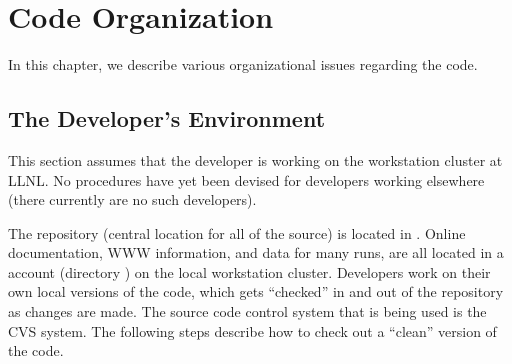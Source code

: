 
\chapter{Code Organization}
\label{Code Organization}

In this chapter, we describe various organizational issues
regarding the \parflow{} code.


\section{The Developer's Environment}
\label{The Developer's Environment}

This section assumes that the developer is working on the workstation
cluster at LLNL.  No procedures have yet been devised for developers
working elsewhere (there currently are no such developers).

The \parflow{} repository (central location for all of the \parflow{}
source) is located in .  Online
documentation, WWW information, and data for many \parflow{} runs, are
all located in a  account (directory ) on
the local workstation cluster.  Developers work on their own local
versions of the code, which gets ``checked'' in and out of the
repository as changes are made.  The source code control system that
is being used is the CVS system.  The following steps describe how to
check out a ``clean'' version of the code.

